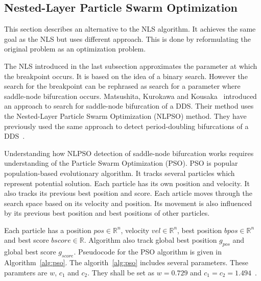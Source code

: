 \subsection{Nested-Layer Particle Swarm Optimization}
This section describes an alternative to the NLS algorithm.
It achieves the same goal as the NLS but uses different approach.
This is done by reformulating the original problem as an optimization problem.
\par
The NLS introduced in the last subsection approximates the parameter at which the breakpoint occurs.
It is based on the idea of a binary search.
However the search for the breakpoint can be rephrased as search for a parameter where saddle-node bifurcation occurs.
Matsushita, Kurokawa and Kousaka~\cite{Matsushita2019} introduced an approach to search for saddle-node bifurcation of a DDS.
Their method uses the Nested-Layer Particle Swarm Optimization (NLPSO) method.
They have previously used the same approach to detect period-doubling bifurcations of a DDS~\cite{Matsushita20170721}.
\par
Understanding how NLPSO detection of saddle-node bifurcation works requires understanding of the Particle Swarm Optimization (PSO).
PSO is popular population-based evolutionary algorithm.
It tracks several particles which represent potential solution.
Each particle has its own position and velocity. It also tracks its previous best position and score.
Each article moves through the search space based on its velocity and position.
Its movement is also influenced by its previous best position and best positions of other particles.~\cite{Matsushita2019}
\par
Each particle has a position $pos \in \mathbb{R}^{n}$, velocity $vel \in \mathbb{R}^{n}$, best position $bpos \in \mathbb{R}^{n}$ and best score $bscore \in \mathbb{R}$.
Algorithm also track global best position $g_{pos}$ and global best score $g_{score}$.
Pseudocode for the PSO algorithm is given in Algorithm~\ref{alg:pso}.
The algorith~\ref{alg:pso} includes several parameters.
These paramters are $w$, $c_{1}$ and $c_{2}$.
They shall be set as $w=0.729$ and $c_{1}=c_{2}=1.494$~\cite{Matsushita2019}.

